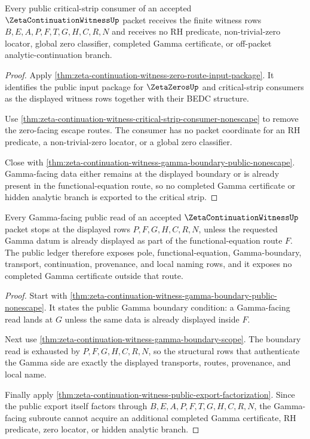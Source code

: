 \begin{theorem}
\label{thm:zeta-continuation-witness-critical-strip-public-refusal}
Every public critical-strip consumer of an accepted $\ZetaContinuationWitnessUp$ packet receives the finite witness rows $B,E,A,P,F,T,G,H,C,R,N$ and receives no RH predicate, non-trivial-zero locator, global zero classifier, completed Gamma certificate, or off-packet analytic-continuation branch.
\end{theorem}
\begin{proof}
Apply \autoref{thm:zeta-continuation-witness-zero-route-input-package}. It identifies the public input package for $\ZetaZerosUp$ and critical-strip consumers as the displayed witness rows together with their BEDC structure.

Use \autoref{thm:zeta-continuation-witness-critical-strip-consumer-nonescape} to remove the zero-facing escape routes. The consumer has no packet coordinate for an RH predicate, a non-trivial-zero locator, or a global zero classifier.

Close with \autoref{thm:zeta-continuation-witness-gamma-boundary-public-nonescape}. Gamma-facing data either remains at the displayed boundary or is already present in the functional-equation route, so no completed Gamma certificate or hidden analytic branch is exported to the critical strip.
\end{proof}

\begin{theorem}
\label{thm:zeta-continuation-witness-gamma-boundary-public-ledger}
Every Gamma-facing public read of an accepted $\ZetaContinuationWitnessUp$ packet stops at the displayed rows $P,F,G,H,C,R,N$, unless the requested Gamma datum is already displayed as part of the functional-equation route $F$. The public ledger therefore exposes pole, functional-equation, Gamma-boundary, transport, continuation, provenance, and local naming rows, and it exposes no completed Gamma certificate outside that route.
\end{theorem}
\begin{proof}
Start with \autoref{thm:zeta-continuation-witness-gamma-boundary-public-nonescape}. It states the public Gamma boundary condition: a Gamma-facing read lands at $G$ unless the same data is already displayed inside $F$.

Next use \autoref{thm:zeta-continuation-witness-gamma-boundary-scope}. The boundary read is exhausted by $P,F,G,H,C,R,N$, so the structural rows that authenticate the Gamma side are exactly the displayed transports, routes, provenance, and local name.

Finally apply \autoref{thm:zeta-continuation-witness-public-export-factorization}. Since the public export itself factors through $B,E,A,P,F,T,G,H,C,R,N$, the Gamma-facing subroute cannot acquire an additional completed Gamma certificate, RH predicate, zero locator, or hidden analytic branch.
\end{proof}
